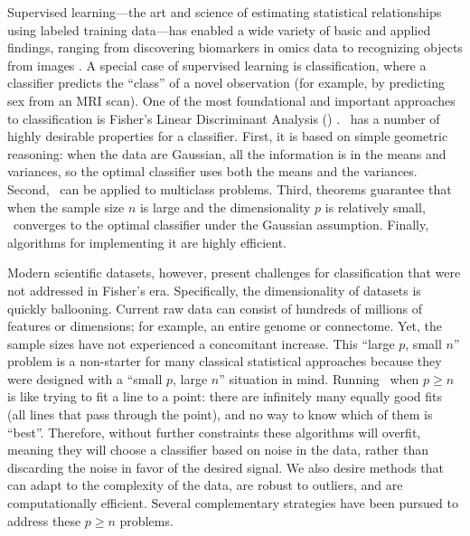 \documentclass[11pt]{extarticle}
\begin{document}



Supervised learning---the art and science of estimating statistical relationships using labeled training data---has  enabled a wide variety of basic and applied findings, ranging from discovering biomarkers in omics data \cite{Vogelstein2014a} to  recognizing objects from images \cite{Krizhevsky2012}.
A special case of supervised learning is classification, where a classifier predicts the ``class'' of a novel observation (for example, by predicting sex from an MRI scan). One of the most foundational and important approaches to classification is Fisher's Linear Discriminant Analysis (\Lda) \cite{Fisher1925a}.
\Lda~has a number of highly desirable properties for a  classifier.
First, it is based on  simple geometric reasoning: when the data are Gaussian, all the information is in the means and variances, so the optimal classifier uses both the means and the variances.
Second,  \Lda~can be applied to multiclass problems.
Third, theorems guarantee that when the sample size $n$ is large and the dimensionality $p$ is relatively small, \Lda~converges to the optimal classifier under the Gaussian assumption.
Finally,  algorithms for implementing it are highly efficient.


Modern scientific datasets, however, present challenges for classification that were not addressed in Fisher's era.
Specifically, the dimensionality of datasets is quickly ballooning.
Current raw data can consist of hundreds of millions  of features or dimensions; for example, an entire genome or connectome.  Yet, the sample sizes have not experienced a concomitant increase.
This ``large $p$, small $n$'' problem is a non-starter
for many classical statistical approaches because they were designed with a ``small $p$, large $n$'' situation in mind.
Running \Lda~when $p \ge n$  is like trying to fit a line to a point: there are infinitely many equally good fits (all lines that pass through the point), and no way to know which of them is ``best''.
Therefore, without further constraints these algorithms will overfit, meaning they will choose a classifier based on noise in the data, rather than discarding the noise in favor of the desired signal.
We also desire methods that  can adapt to the complexity of the data,  are robust to outliers, and are computationally efficient.
% 
Several complementary strategies have been pursued to address these $p \ge n$ problems.
\end{document}
